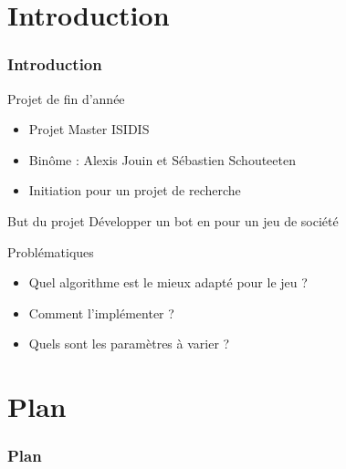 \section*{Introduction}
	\begin{frame}
		\frametitle{Introduction}
		
		\begin{block}{Projet de fin d'année}
			\begin{itemize}
			\item Projet Master ISIDIS
			\item Binôme : Alexis Jouin et Sébastien Schouteeten
			\item Initiation pour un projet de recherche	
			\end{itemize}
		\end{block}
	
		\begin{block}{But du projet}		
			Développer un bot en \java pour un jeu de société \himalaya		
		\end{block}
	
		\begin{alertblock}{Problématiques}
			\begin{itemize}
				\item Quel algorithme est le mieux adapté pour le jeu \himalaya ?
				\item Comment l'implémenter ?
				\item Quels sont les paramètres à varier ?
			\end{itemize}
		\end{alertblock}
	
	\end{frame}
	
	
\section*{Plan}
	\begin{frame} 
		\frametitle{Plan}
		\tableofcontents
	\end{frame}